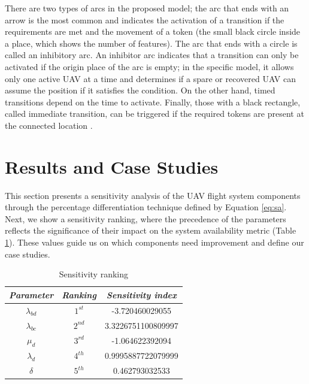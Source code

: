 \documentclass[conference]{IEEEtran}
\begin{document}
There are two types of arcs in the proposed model; the arc that ends with an arrow is the most common and indicates the activation of a transition if the requirements are met and the movement of a token (the small black circle inside a place, which shows the number of features). The arc that ends with a circle is called an inhibitory arc. An inhibitor arc indicates that a transition can only be activated if the origin place of the arc is empty; in the specific model, it allows only one active UAV at a time and determines if a spare or recovered UAV can assume the position if it satisfies the condition. On the other hand, timed transitions depend on the time to activate. Finally, those with a black rectangle, called immediate transition, can be triggered if the required tokens are present at the connected location \citep{melo2021distributed}.

\section{Results and Case Studies}
\label{sec:case_studies}

This section presents a sensitivity analysis of the UAV flight system components through the percentage differentiation technique defined by Equation \ref{eq:sa}. Next, we show a sensitivity ranking, where the precedence of the parameters reflects the significance of their impact on the system availability metric (Table \ref{tab:sa_rank}). These values guide us on which components need improvement and define our case studies.

\begin{table}[htbp]
\caption{Sensitivity ranking}
\begin{center}
\begin{tabular}{c|c|c}
\hline
\textbf{\textit{Parameter}}& \textbf{\textit{Ranking}} & \textbf{\textit{Sensitivity index}} \\
\hline
\hline
\(\lambda_{bd}\) & \(1^{st}\) & -3.720460029055 \\
\(\lambda_{bc}\) & \(2^{nd}\) & 3.3226751100809997 \\
 \(\mu_{d}\) & \(3^{rd}\) & -1.064622392094 \\
\(\lambda_{d}\) & \(4^{th}\) & 0.9995887722079999 \\
\(\delta\) & \(5^{th}\) & 0.462793032533 \\
\hline
\end{tabular}
\label{tab:sa_rank}
\end{center}
\end{table}
\end{document}
